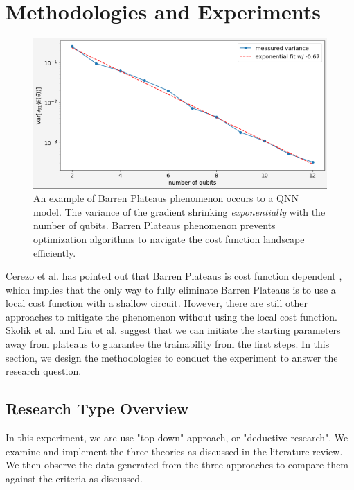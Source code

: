 \section{Methodologies and Experiments}
\begin{figure}
    \includegraphics[width=\textwidth]{./ResearchDesign/Appendices/VarianceShrinking.png}
    \caption{
        An example of Barren Plateaus phenomenon occurs to a QNN model. 
        The variance of the gradient shrinking \textit{exponentially} with the number of qubits. 
        Barren Plateaus phenomenon prevents optimization algorithms to navigate the cost function landscape efficiently.
    }
    \label{Variance Shrinking demo}
\end{figure}

Cerezo et al. has pointed out that Barren Plateaus is cost function dependent \cite{cerezoCostFunctionDependent2021}, which implies that the only way to fully eliminate Barren Plateaus is to use a local cost function with a shallow circuit.
However, there are still other approaches to mitigate the phenomenon without using the local cost function.
Skolik et al. and Liu et al. \cite{skolikLayerwiseLearningQuantum2021, liuParameterInitializationMethod2021} suggest that we can initiate the starting parameters away from plateaus to guarantee the trainability from the first steps.
In this section, we design the methodologies to conduct the experiment to answer the research question.

\subsection{Research Type Overview}
In this experiment, we are use "top-down" approach, or "deductive research". 
We examine and implement the three theories \cite{cerezoCostFunctionDependent2021, liuParameterInitializationMethod2021, skolikLayerwiseLearningQuantum2021} as discussed in the literature review.
We then observe the data generated from the three approaches to compare them against the criteria as discussed.

